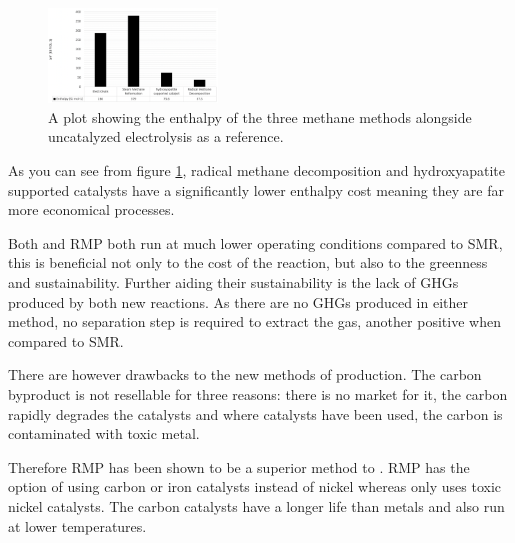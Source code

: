 \begin{figure}[H]
	\centering
	\includegraphics[width=0.4\textwidth]{6b76c760-2cb9-11eb-895f-8c8590753a48.png}
	\caption{A plot showing the enthalpy of the three methane methods alongside uncatalyzed electrolysis as a reference.\cite{SBN2020,Ashok,Saxena2011}}
	\label{fig:ME_disc}
\end{figure}

As you can see from figure \ref{fig:ME_disc}, radical methane decomposition and hydroxyapatite supported  catalysts have a significantly lower enthalpy cost meaning they are far more economical processes.

Both  and RMP both run at much lower operating conditions compared to SMR, this is beneficial not only to the cost of the reaction, but also to the greenness and sustainability.
Further aiding their sustainability is the lack of GHGs produced by both new reactions.
As there are no GHGs produced in either method, no separation step is required to extract the  gas, another positive when compared to SMR.

There are however drawbacks to the new methods of production.
The carbon byproduct is not resellable for three reasons: there is no market for it, the carbon rapidly degrades the catalysts and where  catalysts have been used, the carbon is contaminated with toxic metal\cite{sbn2020}.

Therefore RMP has been shown to be a superior method to .
RMP has the option of using carbon or iron catalysts instead of nickel whereas  only uses toxic nickel catalysts.
The carbon catalysts have a longer life than metals and also run at lower temperatures.
